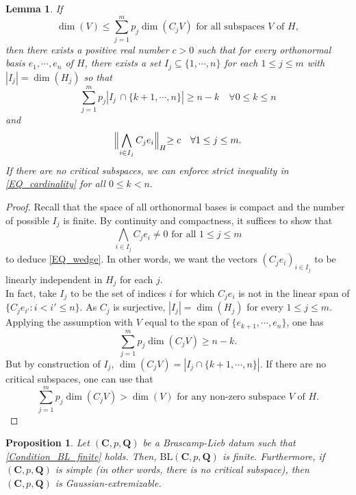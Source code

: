 \documentclass[11pt,a4paper,reqno]{amsart}
\numberwithin{equation}{section}
\newtheorem{lemma}[theorem]{Lemma}
\newtheorem{proposition}[theorem]{Proposition}
\theoremstyle{definition}
\newcommand{\<}{\ensuremath \leq}
\renewcommand{\>}{\ensuremath \geq}
\begin{document}
\begin{lemma}
    If $$\dim(V) \leq \sum_{j=1}^m p_j \dim(C_jV) \text{ for all subspaces } V \text{ of } H,$$ then there exists a positive real number $c>0$ such that for every orthonormal basis $e_1,\cdots,e_n$ of $H$, there exists a set $I_j \subseteq \{1,\cdots,n\}$ for each $1 \leq j \leq m$ with $|I_j|=\dim(H_j)$ so that \begin{equation} \label{EQ_cardinality}\sum_{j=1}^m p_j|I_j \, \cap \{k+1,\cdots,n\}| \geq n-k \quad \forall 0 \leq k \leq n \end{equation} and \begin{equation} \label{EQ_wedge} \Bigl \| \bigwedge_{i \in I_j}C_je_i \Bigl \|_{H} \geq c \quad \forall 1 \leq j \leq m.\end{equation} If there are no critical subspaces, we can enforce strict inequality in \cref{EQ_cardinality} for all $0 \leq k<n.$ 
\end{lemma}

\begin{proof}
    Recall that the space of all orthonormal bases is compact and the number of possible $I_j$ is finite. By continuity and compactness, it suffices to show that $$\bigwedge_{i \in I_j}C_je_i \neq 0 \text{ for all } 1 \leq j \leq m$$ to deduce \cref{EQ_wedge}. In other words, we want the vectors $(C_je_i)_{i \in I_j}$ to be linearly independent in $H_j$ for each $j.$ \\ In fact, take $I_j$ to be the set of indices $i$ for which $C_je_i$ is not in the linear span of $\{C_je_{i'}: i<i' \leq n\}.$ As $C_j$ is surjective, $|I_j|=\dim(H_j)$ for every $1 \leq j \leq m.$ Applying the assumption with $V$ equal to the span of $\{e_{k+1},\cdots,e_n\}$, one has $$\sum_{j=1}^m p_j \dim(C_jV) \geq n-k.$$ But by construction of $I_j$, $\dim(C_jV)=|I_j \cap \{k+1,\cdots,n\}|.$ If there are no critical subspaces, one can use that $$\sum_{j=1}^m p_j\dim(C_jV)>\dim(V) \text{ for any non-zero subspace } V \text{ of } H.$$ 
\end{proof}

\begin{proposition} \label{Prop_Simple_GE}
    Let $(\textbf{C},p,\textbf{Q})$ be a Brascamp-Lieb datum such that \cref{Condition_BL_finite} holds. Then, $\mathrm{BL}(\textbf{C},p,\textbf{Q})$ is finite. 
    Furthermore, if $(\textbf{C},p,\textbf{Q})$ is simple (in other words, there is no critical subspace), then $(\textbf{C},p,\textbf{Q})$ is Gaussian-extremizable. 
\end{proposition}
\end{document}
